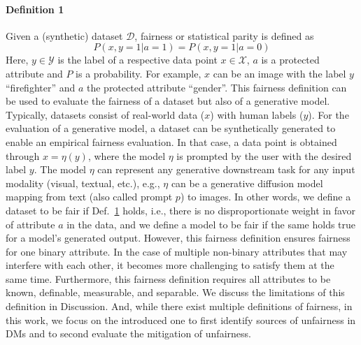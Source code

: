 \documentclass{article}%
\begin{document}
\paragraph{Definition 1}\label{def:fair1}
Given a (synthetic) dataset $\mathcal{D}$, fairness or statistical parity is defined as 
\begin{equation}\label{eq:model_fairness}
    P(x,y = 1|a = 1) = P(x,y = 1|a = 0)
\end{equation}
% 
% 
Here, $y\in \mathcal{Y}$ is the label of a respective data point $x\in \mathcal{X}$, $a$ is a protected attribute and $P$ is a probability. For example, $x$ can be an image with the label $y$ ``firefighter'' and $a$ the protected attribute ``gender''. This fairness definition can be used to evaluate the fairness of a dataset but also of a generative model. Typically, datasets consist of real-world data ($x$) with human labels ($y$). For the evaluation of a generative model, a dataset can be synthetically generated to enable an empirical fairness evaluation. In that case, a data point is obtained through $x=\eta(y)$, where the model $\eta$ is prompted by the user with the desired label $y$. The model $\eta$ can represent any generative downstream task for any input modality (visual, textual, etc.), e.g., $\eta$ can be a generative diffusion model mapping from text (also called prompt $p$) to images. 
In other words, we define a dataset to be fair if Def.~\hyperref[def:fair1]{1} holds, i.e., there is no disproportionate weight in favor of attribute $a$ in the data, and we define a model to be fair if the same holds true for a model's generated output. However, this fairness definition ensures fairness for one binary attribute. In the case of multiple non-binary attributes that may interfere with each other, it becomes more challenging to satisfy them at the same time. Furthermore, this fairness definition requires all attributes to be known, definable, measurable, and separable. We discuss the limitations of this definition in Discussion. And, while there exist multiple definitions of fairness, in this work, we focus on the introduced one to first identify sources of unfairness in DMs and to second evaluate the mitigation of unfairness. 
\end{document}
